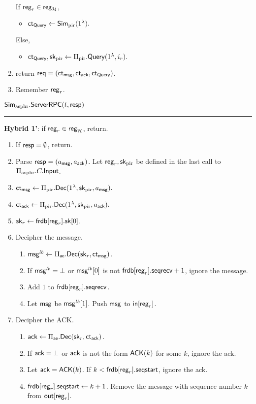 \begin{enumerate}
\begin{siderule}
{     If $\mathsf{reg}_r \in \mathsf{reg}_{\mathcal{H}}$,
    \begin{itemize}
        \item $\mathsf{ct}_{\mathsf{Query}} \leftarrow \mathsf{Sim}_{\text{pir}}(1^{\lambda}).$
    \end{itemize}
    Else, 
    }
    \end{siderule}
    \begin{itemize}
        \item $\mathsf{ct}_{\mathsf{Query}}, {\mathsf{sk}}_{\text{pir}} \leftarrow \Pi_{\text{pir}}.\mathsf{Query}(1^{\lambda}, i_r).$
    \end{itemize}
    \item return $\mathsf{req} = (\mathsf{ct}_{\mathsf{msg}}, \mathsf{ct}_{\mathsf{ack}}, \mathsf{ct}_{\mathsf{Query}})$.
    \item Remember $\mathsf{reg}_r$.
\end{enumerate}
\vspace{10pt}
$\mathbf{\mathsf{Sim}_{\text{asphr}}.\mathsf{ServerRPC}}(t, \mathsf{resp})$
\vspace{5pt}
\hrule
\vspace{5pt}
\begin{siderule}
{ \textbf{Hybrid 1'}: if $\mathsf{reg}_r \in \mathsf{reg}_{\mathcal{H}}$, return.}
\end{siderule}
\begin{enumerate}
    \item If $\mathsf{resp} = \emptyset$, return.
    \item Parse $\mathsf{resp} = (a_{\mathsf{msg}}, a_{\mathsf{ack}})$. Let $\mathsf{reg}_r, {\mathsf{sk}}_{\text{pir}}$ be defined in the last call to $\Pi_{\text{asphr}}.C.\mathsf{Input}$.
    \item $\mathsf{ct}_{\mathsf{msg}} \leftarrow \Pi_{\text{pir}}.\mathsf{Dec}(1^{\lambda}, {\mathsf{sk}}_{\text{pir}}, a_{\mathsf{msg}}).$
    \item $\mathsf{ct}_{\mathsf{ack}} \leftarrow \Pi_{\text{pir}}.\mathsf{Dec}(1^{\lambda}, {\mathsf{sk}}_{\text{pir}}, a_{\mathsf{ack}}).$
    \item ${\mathsf{sk}}_r \leftarrow \mathsf{frdb}[\mathsf{reg}_r].{\mathsf{sk}}[0]$.
    \item Decipher the message.
    \begin{enumerate}
        \item $\mathsf{msg}^{lb} \leftarrow \Pi_{\mathsf{ae}}.\mathsf{Dec}({\mathsf{sk}}_r, \mathsf{ct}_{\mathsf{msg}})$.
        \item If $\mathsf{msg}^{lb} = \bot$ or $\mathsf{msg}^{lb}[0]$ is not $\mathsf{frdb}[\mathsf{reg}_r].\mathsf{seqrecv} + 1$, ignore the message.
        \item Add $1$ to $\mathsf{frdb}[\mathsf{reg}_r].\mathsf{seqrecv}$. 
        \item Let $\mathsf{msg}$ be $\mathsf{msg}^{lb}[1]$. Push $\mathsf{msg}$ to $\mathsf{in}[\mathsf{reg}_r]$.
    \end{enumerate}
    \item Decipher the ACK.
    \begin{enumerate}
        \item $\mathsf{ack} \leftarrow \Pi_{\mathsf{ae}}.\mathsf{Dec}({\mathsf{sk}}_r, \mathsf{ct}_{\mathsf{ack}})$.
        \item If $\mathsf{ack} = \bot$ or $\mathsf{ack}$ is not the form $\mathsf{ACK}(k)$ for some $k$, ignore the ack.
        \item Let $\mathsf{ack} = \mathsf{ACK}(k)$. If $k < \mathsf{frdb}[\mathsf{reg}_r].\mathsf{seqstart}$, ignore the ack.
        \item $\mathsf{frdb}[\mathsf{reg}_r].\mathsf{seqstart} \leftarrow k + 1$. Remove the message with sequence number $k$ from $\mathsf{out}[\mathsf{reg}_r]$.
    \end{enumerate}
\end{enumerate}


